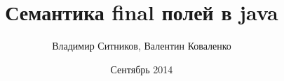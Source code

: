 \title[JMM: Final Fields Semantics]{Семантика final полей в java}
\author{Владимир Ситников, Валентин Коваленко}
\date{\small Сентябрь 2014}

\ifrender
\begin{frame}
  \titlepage
\end{frame}
\fi
